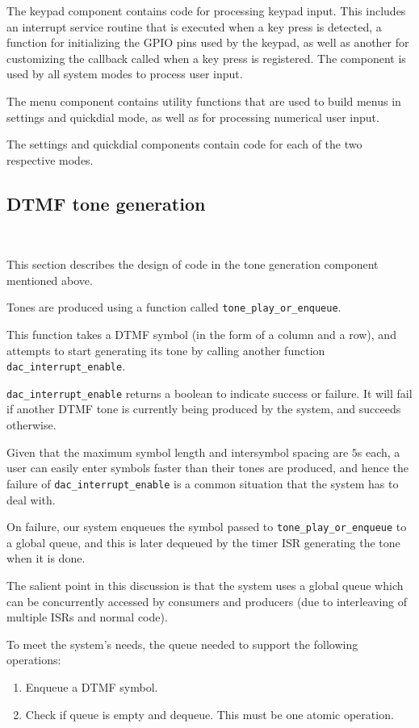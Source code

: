 \documentclass[11pt,a4paper,twocolumn]{scrartcl}
\begin{document}
The keypad component contains code for processing keypad input. This includes an interrupt service routine that is executed when a key press is detected, a function for initializing the GPIO pins used by the keypad, as well as another for customizing the callback called when a key press is registered. The component is used by all system modes to process user input.

The menu component contains utility functions that are used to build menus in settings and quickdial mode, as well as for processing numerical user input.

The settings and quickdial components contain code for each of the two respective modes.

\subsection{DTMF tone generation}~\label{dac}

This section describes the design of code in the tone generation component mentioned above.

Tones are produced using a function called \verb!tone_play_or_enqueue!. 

This function takes a DTMF symbol (in the form of a column and a row), and attempts to start generating its tone by calling another function \verb!dac_interrupt_enable!.

\verb!dac_interrupt_enable! returns a boolean to indicate success or failure. It will fail if another DTMF tone is currently being produced by the system, and succeeds otherwise.

Given that the maximum symbol length and intersymbol spacing are $5$s each, a user can easily enter symbols faster than their tones are produced, and hence the failure of \verb!dac_interrupt_enable! is a common situation that the system has to deal with.

On failure, our system enqueues the symbol passed to \verb!tone_play_or_enqueue! to a global queue, and this is later dequeued by the timer ISR generating the tone when it is done.

The salient point in this discussion is that the system uses a global queue which can be concurrently accessed by consumers and producers (due to interleaving of multiple ISRs and normal code).

To meet the system's needs, the queue needed to support the following operations:
\begin{enumerate}
   \item Enqueue a DTMF symbol.
   \item Check if queue is empty and dequeue. This must be one atomic operation.
\end{enumerate}
\end{document}
